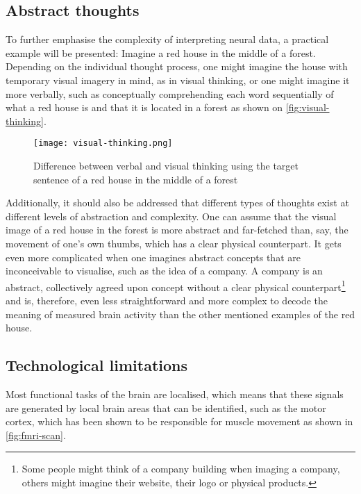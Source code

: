 \subsection{Abstract thoughts}
\label{chapter2-abstract-thoughts}

To further emphasise the complexity of interpreting neural data, a practical example will be presented: Imagine a red house in the middle of a forest. Depending on the individual thought process, one might imagine the house with temporary visual imagery in mind, as in visual thinking, or one might imagine it more verbally, such as conceptually comprehending each word sequentially of what a red house is and that it is located in a forest \citep{amit_asymmetrical_2017} as shown on \autoref{fig:visual-thinking}.

\begin{figure}[ht]
  \centering
  \texttt{[image: visual-thinking.png]}
  \caption{Difference between verbal and visual thinking using the target sentence of a red house in the middle of a forest}
  \label{fig:visual-thinking}
\end{figure}

Additionally, it should also be addressed that different types of thoughts exist at different levels of abstraction and complexity. One can assume that the visual image of a red house in the forest is more abstract and far-fetched than, say, the movement of one's own thumbs, which has a clear physical counterpart. It gets even more complicated when one imagines abstract concepts that are inconceivable to visualise, such as the idea of a company. A company is an abstract, collectively agreed upon concept without a clear physical counterpart\footnote{Some people might think of a company building when imaging a company, others might imagine their website, their logo or physical products.} and is, therefore, even less straightforward and more complex to decode the meaning of measured brain activity than the other mentioned examples of the red house.

\subsection{Technological limitations}
\label{chapter2-technological-limitations}

Most functional tasks of the brain are localised, which means that these signals are generated by local brain areas that can be identified, such as the motor cortex, which has been shown to be responsible for muscle movement as shown in \autoref{fig:fmri-scan}.

